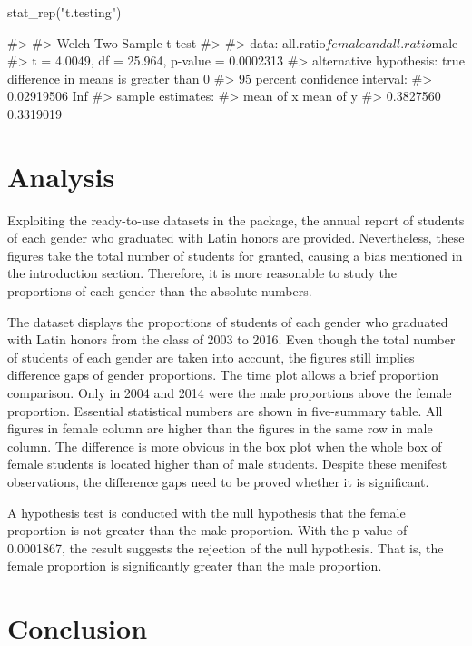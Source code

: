 \begin{Schunk}
\begin{Sinput}
stat_rep("t.testing")
\end{Sinput}
\begin{Soutput}
#> 
#>  Welch Two Sample t-test
#> 
#> data:  all.ratio$female and all.ratio$male
#> t = 4.0049, df = 25.964, p-value = 0.0002313
#> alternative hypothesis: true difference in means is greater than 0
#> 95 percent confidence interval:
#>  0.02919506        Inf
#> sample estimates:
#> mean of x mean of y 
#> 0.3827560 0.3319019
\end{Soutput}
\end{Schunk}

\section{Analysis}\label{analysis}

Exploiting the ready-to-use datasets in the package, the annual report
of students of each gender who graduated with Latin honors are provided.
Nevertheless, these figures take the total number of students for
granted, causing a bias mentioned in the introduction section.
Therefore, it is more reasonable to study the proportions of each gender
than the absolute numbers.

The dataset  displays the proportions of students of
each gender who graduated with Latin honors from the class of 2003 to
2016. Even though the total number of students of each gender are taken
into account, the figures still implies difference gaps of gender
proportions. The time plot allows a brief proportion comparison. Only in
2004 and 2014 were the male proportions above the female proportion.
Essential statistical numbers are shown in five-summary table. All
figures in female column are higher than the figures in the same row in
male column. The difference is more obvious in the box plot when the
whole box of female students is located higher than of male students.
Despite these menifest observations, the difference gaps need to be
proved whether it is significant.

A hypothesis test is conducted with the null hypothesis that the female
proportion is not greater than the male proportion. With the p-value of
0.0001867, the result suggests the rejection of the null hypothesis.
That is, the female proportion is significantly greater than the male
proportion.

\section{Conclusion}\label{conclusion}

